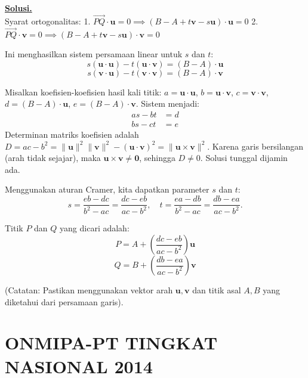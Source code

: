 \documentclass[12pt,twoside]{article}
\newenvironment{solution}
{
	\par\noindent\textbf{\underline{Solusi.}}\\
}
{
	\par
}
\begin{document}
\begin{enumerate}
\begin{solution}
          Syarat ortogonalitas:
          1. $\vec{PQ} \cdot \mathbf{u} = 0 \implies (B - A + t\mathbf{v} - s\mathbf{u}) \cdot \mathbf{u} = 0$
          2. $\vec{PQ} \cdot \mathbf{v} = 0 \implies (B - A + t\mathbf{v} - s\mathbf{u}) \cdot \mathbf{v} = 0$

          Ini menghasilkan sistem persamaan linear untuk $s$ dan $t$:
          \[ s(\mathbf{u} \cdot \mathbf{u}) - t(\mathbf{u} \cdot \mathbf{v}) = (B - A) \cdot \mathbf{u} \]
          \[ s(\mathbf{v} \cdot \mathbf{u}) - t(\mathbf{v} \cdot \mathbf{v}) = (B - A) \cdot \mathbf{v} \]

          Misalkan koefisien-koefisien hasil kali titik:
          $a = \mathbf{u} \cdot \mathbf{u}$, $b = \mathbf{u} \cdot \mathbf{v}$, $c = \mathbf{v} \cdot \mathbf{v}$, $d = (B - A) \cdot \mathbf{u}$, $e = (B - A) \cdot \mathbf{v}$.
          Sistem menjadi:
          \begin{align*}
            a s - b t & = d \\
            b s - c t & = e
          \end{align*}
          Determinan matriks koefisien adalah $D = ac - b^2 = \|\mathbf{u}\|^2 \|\mathbf{v}\|^2 - (\mathbf{u} \cdot \mathbf{v})^2 = \|\mathbf{u} \times \mathbf{v}\|^2$.
          Karena garis bersilangan (arah tidak sejajar), maka $\mathbf{u} \times \mathbf{v} \ne \mathbf{0}$, sehingga $D \ne 0$. Solusi tunggal dijamin ada.

          Menggunakan aturan Cramer, kita dapatkan parameter $s$ dan $t$:
          \[ s = \frac{e b - d c}{b^2 - a c} = \frac{d c - e b}{a c - b^2}, \quad t = \frac{e a - d b}{b^2 - a c} = \frac{d b - e a}{a c - b^2}. \]

          Titik $P$ dan $Q$ yang dicari adalah:
          \[ P = A + \left(\frac{d c - e b}{a c - b^2}\right)\mathbf{u} \]
          \[ Q = B + \left(\frac{d b - e a}{a c - b^2}\right)\mathbf{v} \]

          (Catatan: Pastikan menggunakan vektor arah $\mathbf{u}, \mathbf{v}$ dan titik asal $A, B$ yang diketahui dari persamaan garis).
        \end{solution}
\end{enumerate}
\newpage
{}
\section{ONMIPA-PT TINGKAT NASIONAL 2014}
\end{document}
